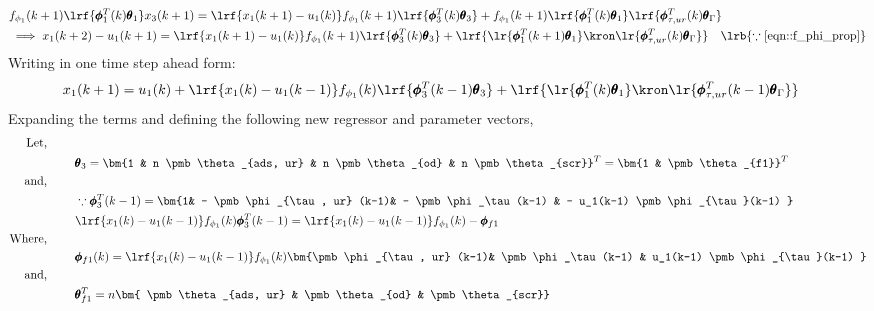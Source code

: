 \begin{align*}
      &f_{\phi_1}(k+1) \lrf{\pmb \phi_1^T(k) \pmb \theta_1} x_3(k+1)
                = \lrf{{x_1(k+1) - u_1(k)}} f_{\phi_1}(k+1)\lrf{\pmb \phi_3^T (k) \pmb \theta_3}
                + f_{\phi_1}(k+1)\lrf{\pmb \phi_1^T(k) \pmb \theta_1} \lrf{\pmb \phi^T_{\tau, ur}(k) \pmb \theta_\Gamma}\\
      &\implies {x_1(k+2) - u_1(k+1)} = \lrf{{x_1(k+1) - u_1(k)}} f_{\phi_1}(k+1)\lrf{\pmb \phi_3^T (k) \pmb \theta_3}
                + \lrf{ \lr{\pmb \phi_1^T(k+1) \pmb \theta_1} \kron \lr{\pmb \phi^T_{\tau, ur}(k) \pmb \theta_\Gamma}}
        \quad \lrb{\because \ref{eqn::f_phi_prop}}
\end{align*}
Writing in one time step ahead form:
\begin{align}
        x_1(k+1) &=  u_1(k)  +
                     \lrf{{x_1(k) - u_1(k-1)}} f_{\phi_1}(k)\lrf{\pmb \phi_3^T (k-1) \pmb \theta_3}+
                     \lrf{ \lr{\pmb \phi_1^T(k) \pmb \theta_1} \kron \lr{\pmb \phi^T_{\tau, ur}(k-1) \pmb \theta_\Gamma}}
        \label{eqn::r_nox_2}
\end{align}
Expanding the terms and defining the following new regressor and parameter vectors,
\begin{align*}
        \text{Let, } \qquad &\\
        &\pmb \theta_3 = \bm{1 &
                             n \pmb \theta_{ads, ur}    &
                             n \pmb \theta_{od}         &
                             n \pmb \theta_{scr}}^T
                        = \bm{1 & \pmb \theta_{f1}}^T\\
        \text{and, } \qquad &\\
        &\because \pmb \phi_3^T(k-1) = \bm{1&
                                                  - \pmb \phi_{\tau, ur} (k-1)&
                                                  - \pmb \phi_\tau (k-1) &
                                                  - u_1(k-1) \pmb \phi_{\tau}(k-1) }\\
        &\lrf{{x_1(k) - u_1(k-1)}} f_{\phi_1}(k) \pmb \phi_3^T (k-1)  = \lrf{{x_1(k) - u_1(k-1)}} f_{\phi_1}(k) - \pmb \phi_{f1}\\
        \text{Where, } \qquad &\\
        &\pmb \phi_{f1}(k)
                = \lrf{{x_1(k) - u_1(k-1)}} f_{\phi_1}(k)
                \bm{\pmb \phi_{\tau, ur} (k-1)&
                    \pmb \phi_\tau (k-1) &
                    u_1(k-1) \pmb \phi_{\tau}(k-1) }\\
        \text{and, } \qquad &\\
        &\pmb \theta_{f1}^T = n \bm{ \pmb \theta_{ads, ur}  & \pmb \theta_{od}  & \pmb \theta_{scr}}\\
\end{align*}
